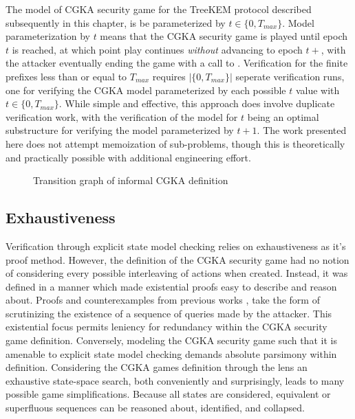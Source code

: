 The model of CGKA security game for the TreeKEM protocol described subsequently in this chapter, is be parameterized by $t \in \{ 0, T_{max} \}$.
Model parameterization by $t$ means that the CGKA security game is played until epoch $t$ is reached, at which point play continues \emph{without} advancing to epoch $t+$, with the attacker eventually ending the game with a call to .
Verification for the finite \CGKAsec prefixes less than or equal to \(T_{max}\) requires $|\{ 0, T_{max} \}|$ seperate verification runs, one for verifying the CGKA model parameterized by each possible $t$ value with $t \in \{ 0, T_{max} \}$.
While simple and effective, this approach does involve duplicate verification work, with the verification of the model for $t$ being an optimal substructure for verifying the model parameterized by $t+1$.
The work presented here does not attempt memoization of sub-problems, though this is theoretically and practically possible with additional engineering effort.

\begin{figure}
  \centering
  \caption{\label{fig:CGKA-informal}Transition graph of informal CGKA definition}
\end{figure}


\hypertarget{exhaustiveness}{%
\subsection{Exhaustiveness}\label{exhaustiveness}}

Verification through explicit state model checking relies on exhaustiveness as it's proof method.
However, the definition of the CGKA security game had no notion of considering every possible interleaving of actions when created.
Instead, it was defined in a manner which made existential proofs easy to describe and reason about.
Proofs and counterexamples from previous works \autocite{alwen2019double}, \autocite{alwen2020security} take the form of scrutinizing the existence of a sequence of queries made by the attacker.
This existential focus permits leniency for redundancy within the CGKA security game definition.
Conversely, modeling the CGKA security game such that it is amenable to explicit state model checking demands absolute parsimony within definition.
Considering the CGKA games definition through the lens an exhaustive state-space search, both conveniently and surprisingly, leads to many possible game simplifications.
Because all states are considered, equivalent or superfluous sequences can be reasoned about, identified, and collapsed.

